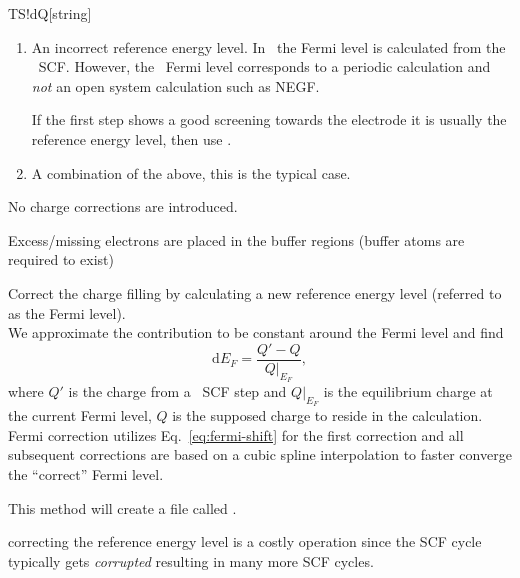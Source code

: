 \begin{fdfentry}{TS!dQ}[string]
\begin{enumerate}
    Additionally one may compare the final output such as total
    energies, calculated DOS and ADOS (see \tbtrans). If the two
    calculations show different properties, one should carefully
    examine the system setup.

    \item An incorrect reference energy level. In \tsiesta\ the Fermi
    level is calculated from the \siesta\ SCF. However, the \siesta\
    Fermi level corresponds to a periodic calculation and \emph{not}
    an open system calculation such as NEGF.

    If the first step shows a good screening towards the electrode it
    is usually the reference energy level, then use \fdf{TS!dQ:fermi}.

    \item A combination of the above, this is the typical case.
  \end{enumerate}

  \begin{fdfoptions}

    \option[none]%
    No charge corrections are introduced.

    \option[buffer]%
    Excess/missing electrons are placed in the buffer regions (buffer
    atoms are required to exist)

    \option[fermi] %
    Correct the charge filling by calculating a new reference energy
    level (referred to as the Fermi level). \\
    We approximate the contribution to be constant around the Fermi
    level and find
    \begin{equation}
      \label{eq:fermi-shift}
      \mathrm{d}E_F = \frac{Q'-Q}{Q|_{E_F}},
    \end{equation}
    where $Q'$ is the charge from a \tsiesta\ SCF step
    and $Q|_{E_F}$ is the equilibrium charge at the current Fermi
    level, $Q$ is the supposed charge to reside in the
    calculation. Fermi correction utilizes Eq.~\eqref{eq:fermi-shift} for
    the first correction and all subsequent corrections are based on a
    cubic spline interpolation to faster converge the
    ``correct'' Fermi level.
    
    This method will create a file called .

    \note correcting the reference energy level is a costly
    operation since the SCF cycle typically gets
    \emph{corrupted} resulting in many more SCF cycles.

  \end{fdfoptions}

\end{fdfentry}

